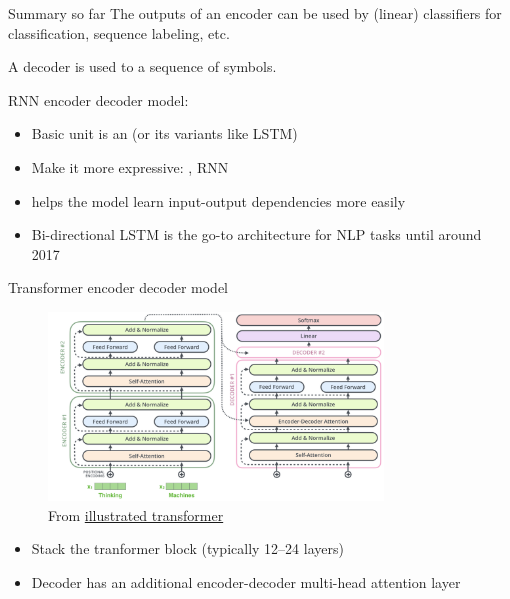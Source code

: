 \documentclass[usenames,dvipsnames,notes,11pt,aspectratio=169,hyperref={colorlinks=true, linkcolor=blue}]{beamer}
\begin{document}
\begin{frame}
    {Summary so far}
    The outputs of an encoder can be used by (linear) classifiers for classification, sequence labeling, etc.

    A decoder is used to  a sequence of symbols.

    RNN encoder decoder model:\\
    \begin{itemize}
        \item Basic unit is an  (or its variants like LSTM)
        \item Make it more expressive: ,  RNN
        \item {} helps the model learn input-output dependencies more easily
        \item Bi-directional LSTM is the go-to architecture for NLP tasks until around 2017
    \end{itemize}
\end{frame}

\begin{frame}
    {Transformer encoder decoder model}
    \begin{figure}
        \includegraphics[height=5cm]{figures/transformer-enc-dec}
        \caption{From \href{https://jalammar.github.io/illustrated-transformer/}{illustrated transformer}}
    \end{figure}
    \vspace{-2em}

    \begin{itemize}
        \item Stack the tranformer block (typically 12--24 layers)
        \item Decoder has an additional encoder-decoder multi-head attention layer
    \end{itemize}
\end{frame}
\end{document}
